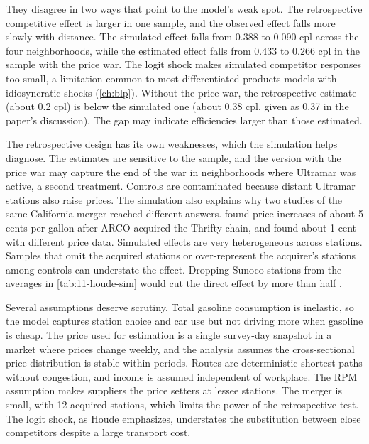 They disagree in two ways that point to the model's weak spot. The retrospective competitive effect is larger in
one sample, and the observed effect falls more slowly with distance. The simulated effect falls from 0.388 to 0.090
cpl across the four neighborhoods, while the estimated effect falls from 0.433 to 0.266 cpl in the sample with the
price war. The logit shock makes simulated competitor responses too small, a limitation common to most differentiated
products models with idiosyncratic shocks (\cref{ch:blp}). Without the price war, the retrospective estimate (about
0.2 cpl) is below the simulated one (about 0.38 cpl, given as 0.37 in the paper's discussion). The gap may indicate
efficiencies larger than those estimated.

The retrospective design has its own weaknesses, which the simulation helps diagnose. The estimates are sensitive to
the sample, and the version with the price war may capture the end of the war in neighborhoods where Ultramar was
active, a second treatment. Controls are contaminated because distant Ultramar stations also raise prices. The
simulation also explains why two studies of the same California merger reached different answers.
\citet{Hastings2004} found price increases of about 5 cents per gallon after ARCO acquired the Thrifty chain, and
\citet{TaylorKreisleZimmerman2010} found about 1 cent with different price data. Simulated effects are very
heterogeneous across stations. Samples that omit the acquired stations or over-represent the acquirer's stations
among controls can understate the effect. Dropping Sunoco stations from the averages in \cref{tab:11-houde-sim}
would cut the direct effect by more than half \citep[pp.~2178--2179]{Houde2012}.

Several assumptions deserve scrutiny. Total gasoline consumption is inelastic, so the model captures station choice
and car use but not driving more when gasoline is cheap. The price used for estimation is a single survey-day
snapshot in a market where prices change weekly, and the analysis assumes the cross-sectional price distribution is
stable within periods. Routes are deterministic shortest paths without congestion, and income is assumed independent
of workplace. The RPM assumption makes suppliers the price setters at lessee stations. The merger is small, with 12
acquired stations, which limits the power of the retrospective test. The logit shock, as Houde emphasizes, understates
the substitution between close competitors despite a large transport cost.

